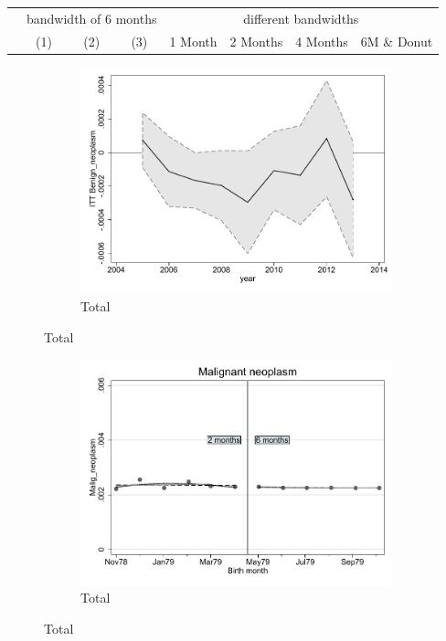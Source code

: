 \documentclass[a4paper ]{article}
\begin{document}
\begin{table}[h]\centering
\def\sym#1{\ifmmode^{#1}\else\(^{#1}\)\fi}
\begin{tabular}{l*{3}{c}|cccc}
\toprule
&\multicolumn{3}{c}{bandwidth of 6 months} & \multicolumn{4}{c}{different bandwidths} \\
 \cmidrule(lr{1em}){2-4} \cmidrule(lr{1em}){5-8}
 &\multicolumn{1}{c}{(1)}&\multicolumn{1}{c}{(2)}&\multicolumn{1}{c}{(3)}& 1 Month & 2 Months & 4 Months & 6M \& Donut \\
\midrule 

\bottomrule
\end{tabular}
\end{table}

\begin{figure}[h!]
	\centering
	\begin{subfigure}[t]{0.5\textwidth}
		\centering
		\includegraphics[width=0.99\textwidth]{R1_LC_Benign_neoplasm}
		\caption{Total}		
	\end{subfigure}
\end{figure}
\newpage
\begin{figure}[h]
	\centering
	\begin{subfigure}[t]{0.5\textwidth}
		\centering
		\includegraphics[width=0.99\textwidth]{R1_RD_Malig_neoplasm_fits}
		\caption{Total}		
	\end{subfigure}
\end{figure}
\end{document}
